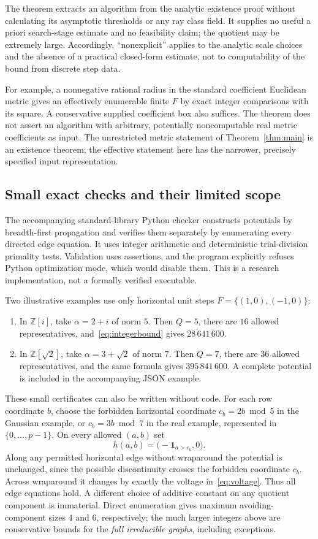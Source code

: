 \documentclass[11pt]{article}
\numberwithin{equation}{section}
\theoremstyle{definition}\newtheorem{definition}[theorem]{Definition}
\theoremstyle{remark}\newtheorem{remark}[theorem]{Remark}
\newcommand{\Z}{\mathbb Z}\newcommand{\Q}{\mathbb Q}\newcommand{\R}{\mathbb R}
\begin{document}
The theorem extracts an algorithm from the analytic existence proof without calculating its asymptotic thresholds or any ray class field. It supplies no useful a priori search-stage estimate and no feasibility claim; the quotient may be extremely large. Accordingly, ``nonexplicit'' applies to the analytic scale choices and the absence of a practical closed-form estimate, not to computability of the bound from discrete step data.

For example, a nonnegative rational radius in the standard coefficient Euclidean metric gives an effectively enumerable finite $F$ by exact integer comparisons with its square. A conservative supplied coefficient box also suffices. The theorem does not assert an algorithm with arbitrary, potentially noncomputable real metric coefficients as input. The unrestricted metric statement of Theorem~\ref{thm:main} is an existence theorem; the effective statement here has the narrower, precisely specified input representation.

\subsection{Small exact checks and their limited scope}

The accompanying standard-library Python checker constructs potentials by breadth-first propagation and verifies them separately by enumerating every directed edge equation. It uses integer arithmetic and deterministic trial-division primality tests. Validation uses assertions, and the program explicitly refuses Python optimization mode, which would disable them. This is a research implementation, not a formally verified executable.

Two illustrative examples use only horizontal unit steps $F=\{(1,0),(-1,0)\}$:
\begin{enumerate}[leftmargin=2em]
\item In $\Z[i]$, take $\alpha=2+i$ of norm $5$. Then $Q=5$, there are $16$ allowed representatives, and~\eqref{eq:integerbound} gives $28\,641\,600$.
\item In $\Z[\sqrt2]$, take $\alpha=3+\sqrt2$ of norm $7$. Then $Q=7$, there are $36$ allowed representatives, and the same formula gives $395\,841\,600$. A complete potential is included in the accompanying JSON example.
\end{enumerate}
These small certificates can also be written without code. For each row coordinate $b$, choose the forbidden horizontal coordinate $c_b=2b\bmod5$ in the Gaussian example, or $c_b=3b\bmod7$ in the real example, represented in $\{0,\ldots,p-1\}$. On every allowed $(a,b)$ set
\[
 h(a,b)=\bigl(-\mathbf1_{a>c_b},0\bigr).
\]
Along any permitted horizontal edge without wraparound the potential is unchanged, since the possible discontinuity crosses the forbidden coordinate $c_b$. Across wraparound it changes by exactly the voltage in~\eqref{eq:voltage}. Thus all edge equations hold. A different choice of additive constant on any quotient component is immaterial. Direct enumeration gives maximum avoiding-component sizes $4$ and $6$, respectively; the much larger integers above are conservative bounds for the \emph{full irreducible graphs}, including exceptions.
\end{document}
